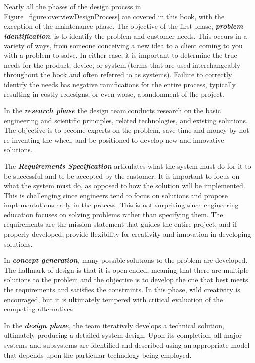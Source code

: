 Nearly all the phases of the design process in Figure~\ref{figure:overviewDesignProcess} 
are covered in this book, with the exception of the maintenance phase. The objective of
the first phase, \emph{\textbf{problem identification}}, is to identify
the problem and customer needs. This occurs in a variety of ways, from
someone conceiving a new idea to a client coming to you with a problem
to solve. In either case, it is important to determine the true needs
for the product, device, or system (terms that are used interchangeably
throughout the book and often referred to as systems). Failure to
correctly identify the needs has negative ramifications for the entire
process, typically resulting in costly redesigns, or even worse,
abandonment of the project.

In the \emph{\textbf{research phase}} the design team conducts research
on the basic engineering and scientific principles, related
technologies, and existing solutions. The objective is to become experts
on the problem, save time and money by not re-inventing the wheel, and
be positioned to develop new and innovative solutions.

The \emph{\textbf{Requirements Specification}} articulates what the
system must do for it to be successful and to be accepted by the
customer. It is important to focus on what the system must do, as
opposed to how the solution will be implemented. This is challenging
since engineers tend to focus on solutions and propose implementations
early in the process. This is not surprising since engineering education
focuses on solving problems rather than specifying them. The
requirements are the mission statement that guides the entire project,
and if properly developed, provide flexibility for creativity and
innovation in developing solutions.

In \emph{\textbf{concept generation},} many possible solutions to the
problem are developed. The hallmark of design is that it is open-ended,
meaning that there are multiple solutions to the problem and the
objective is to develop the one that best meets the requirements and
satisfies the constraints. In this phase, wild creativity is encouraged,
but it is ultimately tempered with critical evaluation of the competing
alternatives.

In the \emph{\textbf{design phase},} the team iteratively develops a
technical solution, ultimately producing a detailed system design. Upon
its completion, all major systems and subsystems are identified and
described using an appropriate model that depends upon the particular
technology being employed.

